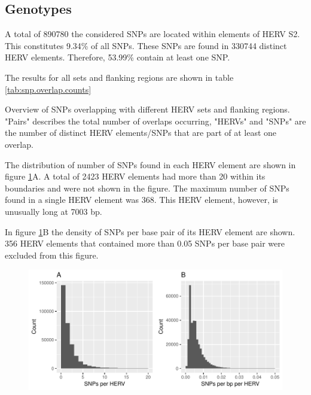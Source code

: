 \documentclass[a4paper,12pt,twoside,openright]{report}
\begin{document}
\subsection{Genotypes}
A total of 890780 the considered SNPs are located within elements of HERV S2. This constitutes 9.34\% of all SNPs. These SNPs are found in 330744 distinct HERV elements. Therefore, 53.99\% contain at least one SNP.

The results for all sets and flanking regions are shown in table \ref{tab:snp.overlap.counts}

\begin{table}[h!]
  \begin{center}
  \end{center}        
	\caption{Overview of SNPs overlapping with different HERV sets and flanking regions. "Pairs" describes the total number of overlaps occurring, "HERVs" and "SNPs" are the number of distinct HERV elements/SNPs that are part of at least one overlap.}
	\label{tab:snp.overlap.counts}
\end{table} 

The distribution of number of SNPs found in each HERV element are shown in figure \ref{fig:hervS2.snp.hist}A. A total of 2423 HERV elements had more than 20 within its boundaries and were not shown in the figure. The maximum number of SNPs found in a single HERV element was 368. This HERV element, however, is unusually long at 7003 bp. 

In figure \ref{fig:hervS2.snp.hist}B the density of SNPs per base pair of its HERV element are shown. 356 HERV elements that contained more than 0.05 SNPs per base pair were excluded from this figure.

\begin{figure}[tb]
	\includegraphics[scale = 1, keepaspectratio = true]{../figures/hervS2_snp_hist}  
	\caption{}
    \label{fig:hervS2.snp.hist}
\end{figure}
\end{document}
